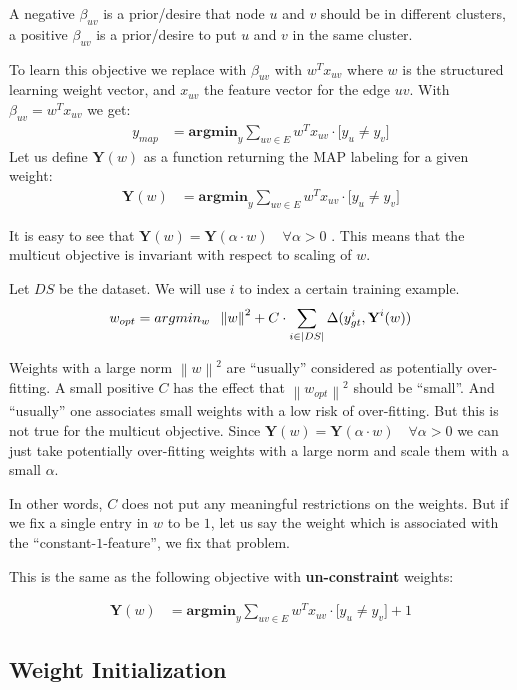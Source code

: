 \documentclass{article}
\newcommand{\norm}[1]{\left\lVert#1\right\rVert}
\begin{document}
A negative $\beta_{uv}$ is a prior/desire that node $u$ and $v$ should be
in different clusters, a positive $\beta_{uv}$ is a prior/desire to
put $u$ and $v$ in the same cluster.

To learn this objective we replace with $\beta_{uv}$
with $w^Tx_{uv}$ where $w$ is the structured learning weight 
vector, and $x_{uv}$ the feature vector for the edge $uv$.
With  $\beta_{uv} = w^Tx_{uv}$ we get:
\begin{align*}
    y_{map} &=   
        \textbf{argmin}_{y} 
                \sum_{ uv \in E} 
                    w^Tx_{uv} \cdot \big[ y_u \neq y_v \big] 
\end{align*}
Let us define $\textbf{Y}(w)$ as a function returning the MAP labeling for a given weight:
\begin{align*}
    \textbf{Y}(w) & =   
        \textbf{argmin}_{y} 
                \sum_{ uv \in E} 
                    w^Tx_{uv} \cdot \big[ y_u \neq y_v \big]
\end{align*}

It is easy to see that $\textbf{Y}(w) = \textbf{Y}( \alpha \cdot w) \quad\forall \alpha > 0$ . This means that
the multicut objective is invariant with respect to scaling of $w$.




Let $DS$ be the dataset.
We will use $i$ to index a certain training example.
\begin{align*}
    w_{opt} = 
        argmin_{w} 
        \hspace{0.2cm} \norm{w}^2 + 
        C \cdot 
        \sum_{i \in |DS|}  
        \Delta(y^i_{gt},\textbf{Y}^i(w))
\end{align*}

Weights with a large norm $\norm{w}^2$ are ``usually'' considered as potentially over-fitting.
A small positive $C$ has the effect that $\norm{w_{opt}}^2$ should be ``small''.
And  ``usually'' one associates small weights with a low risk of over-fitting.
But this is not true for the multicut objective.
Since $\textbf{Y}(w) = \textbf{Y}( \alpha \cdot w) \quad\forall \alpha > 0$ we
can just take potentially over-fitting weights with a large norm and scale them
with a small $\alpha$. 

In other words, $C$ does not put any meaningful restrictions on the weights.
But if we fix a single entry in $w$ to be $1$, let us say the weight which is associated with the ``constant-$1$-feature'',
we fix that problem.

This is the same as the following objective with \textbf{un-constraint} weights:

\begin{align*}
    \textbf{Y}(w) & =   
        \textbf{argmin}_{y} 
                \sum_{ uv \in E} 
                    w^Tx_{uv} \cdot \big[ y_u \neq y_v \big] + 1
\end{align*}



\subsection{Weight Initialization}
\end{document}
